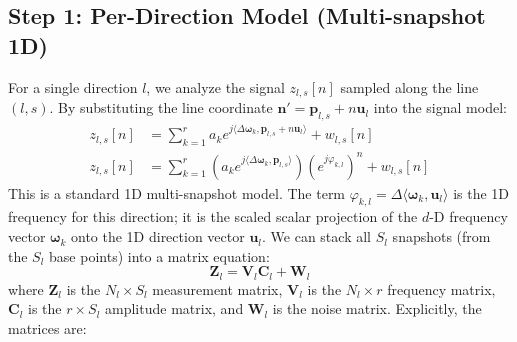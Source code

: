 \subsection{Step 1: Per-Direction Model (Multi-snapshot 1D)}
For a single direction $l$, we analyze the signal $z_{l,s}[n]$ sampled along the line $(l, s)$.
By substituting the line coordinate $\boldsymbol{n}' = \boldsymbol{p}_{l,s} + n \boldsymbol{u}_l$ into the signal model:
\begin{align*}
    z_{l,s}[n] &= \sum_{k=1}^{r} a_k e^{j\langle \Delta \boldsymbol{\omega}_k, \boldsymbol{p}_{l,s} + n \boldsymbol{u}_l \rangle} + w_{l,s}[n] \\
    z_{l,s}[n] &= \sum_{k=1}^{r} \left( a_k e^{j\langle \Delta \boldsymbol{\omega}_k, \boldsymbol{p}_{l,s} \rangle} \right) \left( e^{j\varphi_{k,l}} \right)^n + w_{l,s}[n]
\end{align*}
This is a standard 1D multi-snapshot model. The term $\varphi_{k,l} = \Delta \langle \boldsymbol{\omega}_k, \boldsymbol{u}_l \rangle$ is the 1D frequency for this direction; it is the scaled scalar projection of the $d$-D frequency vector $\boldsymbol{\omega}_k$ onto the 1D direction vector $\boldsymbol{u}_l$.
We can stack all $S_l$ snapshots (from the $S_l$ base points) into a matrix equation:
$$ \mathbf{Z}_l = \mathbf{V}_l \mathbf{C}_l + \mathbf{W}_l $$
where $\mathbf{Z}_l$ is the $N_l \times S_l$ measurement matrix, $\mathbf{V}_l$ is the $N_l \times r$ frequency matrix, $\mathbf{C}_l$ is the $r \times S_l$ amplitude matrix, and $\mathbf{W}_l$ is the noise matrix.
Explicitly, the matrices are:

